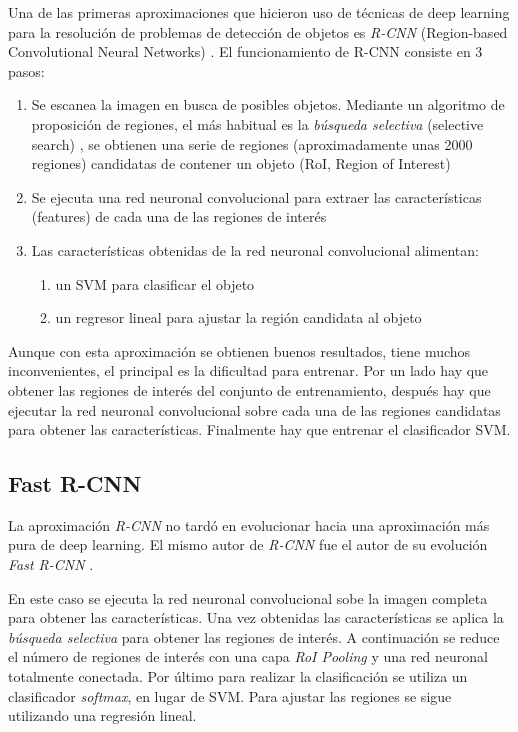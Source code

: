 Una de las primeras aproximaciones que hicieron uso de técnicas de deep learning para la resolución de problemas de detección de objetos es \textit{R-CNN} (Region-based Convolutional Neural Networks) \cite{s2_stateofart_rcnn}. El funcionamiento de R-CNN consiste en 3 pasos:

\begin{enumerate}
	\item Se escanea la imagen en busca de posibles objetos. Mediante un algoritmo de proposición de regiones, el más habitual es la \textit{búsqueda selectiva} (selective search) \cite{s2_stateofart_selectivesearch}, se obtienen una serie de regiones (aproximadamente unas 2000 regiones) candidatas de contener un objeto (RoI, Region of Interest)
	\item Se ejecuta una red neuronal convolucional para extraer las características (features) de cada una de las regiones de interés
	\item Las características obtenidas de la red neuronal convolucional alimentan:
	\begin{enumerate}
		\item un SVM para clasificar el objeto
		\item un regresor lineal para ajustar la región candidata al objeto
	\end{enumerate}
\end{enumerate}

Aunque con esta aproximación se obtienen buenos resultados, tiene muchos inconvenientes, el principal es la dificultad para entrenar. Por un lado hay que obtener las regiones de interés del conjunto de entrenamiento, después hay que ejecutar la red neuronal convolucional sobre cada una de las regiones candidatas para obtener las características. Finalmente hay que entrenar el clasificador SVM.

\subsection*{Fast R-CNN}

La aproximación \textit{R-CNN} no tardó en evolucionar hacia una aproximación más pura de deep learning. El mismo autor de \textit{R-CNN} fue el autor de su evolución \textit{Fast R-CNN} \cite{s2_stateofart_fastrcnn}.

En este caso se ejecuta la red neuronal convolucional sobe la imagen completa para obtener las características. Una vez obtenidas las características se aplica la \textit{búsqueda selectiva} para obtener las regiones de interés. A continuación se reduce el número de regiones de interés con una capa \textit{RoI Pooling} y una red neuronal totalmente conectada. Por último para realizar la clasificación se utiliza un clasificador \textit{softmax}, en lugar de SVM. Para ajustar las regiones se sigue utilizando una regresión lineal.


